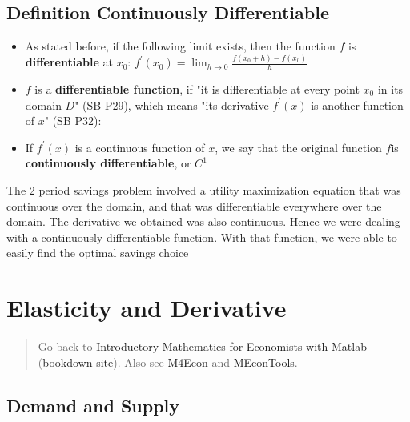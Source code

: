 \documentclass[
]{book}
\begin{document}
\hypertarget{definition-continuously-differentiable}{%
\subsection{Definition Continuously Differentiable}\label{definition-continuously-differentiable}}

\begin{itemize}
\item
  As stated before, if the following limit exists, then the function
  \(f\) is \textbf{differentiable} at \(x_0\):
  \(f^{\prime } (x_0 )=\lim_{h\to 0} \frac{f(x_0 +h)-f(x_0 )}{h}\)
\item
  \(f\) is a \textbf{differentiable function}, if "it is differentiable at
  every point \(x_0\) in its domain \(D\)" (SB P29), which means "its
  derivative \(f^{\prime } (x)\) is another function of \(x\)" (SB P32):
\item
  If \(f^{\prime } (x)\) is a continuous function of \(x\), we say that
  the original function \(f\)is \textbf{continuously differentiable}, or
  \(C^{{\textrm{1}}}\)
\end{itemize}

The 2 period savings problem involved a utility maximization equation
that was continuous over the domain, and that was differentiable
everywhere over the domain. The derivative we obtained was also
continuous. Hence we were dealing with a continuously differentiable
function. With that function, we were able to easily find the optimal
savings choice

\hypertarget{elasticity-and-derivative}{%
\section{Elasticity and Derivative}\label{elasticity-and-derivative}}

\begin{quote}
Go back to \href{https://math4econ.github.io/}{Introductory Mathematics for Economists with Matlab} (\href{https://math4econ.github.io/bookdown}{bookdown site}). Also see \href{http://fanwangecon.github.io/M4Econ}{M4Econ} and \href{https://fanwangecon.github.io/MEconTools/}{MEconTools}.
\end{quote}

\hypertarget{demand-and-supply}{%
\subsection{Demand and Supply}\label{demand-and-supply}}
\end{document}
